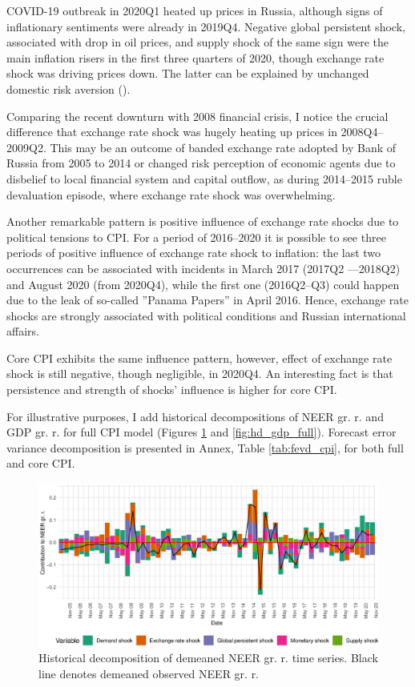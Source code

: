 \documentclass[12pt, a4paper]{extarticle}
\begin{document}
COVID-19 outbreak in 2020Q1 heated up prices in Russia, although signs of inflationary sentiments were already in 2019Q4. Negative global persistent shock, associated with drop in oil prices, and supply shock of the same sign were the main inflation risers in the first three quarters of 2020, though exchange rate shock was driving prices down. The latter can be explained by unchanged domestic risk aversion (\cite[p. 258]{Forbes2018}).

Comparing the recent downturn with 2008 financial crisis, I notice the crucial difference that exchange rate shock was hugely heating up prices in 2008Q4--2009Q2. This may be an outcome of banded exchange rate adopted by Bank of Russia from 2005 to 2014 or changed risk perception of economic agents due to disbelief to local financial system and capital outflow, as during 2014--2015 ruble devaluation episode, where exchange rate shock was overwhelming.

Another remarkable pattern is positive influence of exchange rate shocks due to political tensions to CPI. For a period of 2016--2020 it is possible to see three periods of positive influence of exchange rate shock to inflation: the last two occurrences can be associated with incidents in March 2017 (2017Q2 ---2018Q2) and August 2020 (from 2020Q4), while the first one (2016Q2--Q3) could happen due to the leak of so-called ''Panama Papers'' in April 2016. Hence, exchange rate shocks are strongly associated with political conditions and Russian international affairs.

Core CPI exhibits the same influence pattern, however, effect of exchange rate shock is still negative, though negligible, in 2020Q4. An interesting fact is that persistence and strength of shocks' influence is higher for core CPI. 

For illustrative purposes, I add historical decompositions of NEER gr. r. and GDP gr. r. for full CPI model (Figures \ref{fig:hd_neer_full} and \ref{fig:hd_gdp_full}). Forecast error variance decomposition is presented in Annex, Table \ref{tab:fevd_cpi}, for both full and core CPI.

\begin{figure}[h!]
	\centering
	\includegraphics[width=0.95\linewidth]{figures/hd_exrate_full}
	\caption[]{Historical decomposition of demeaned NEER gr. r. time series. Black line denotes demeaned observed NEER gr. r.}
	\label{fig:hd_neer_full}
\end{figure}
\end{document}
